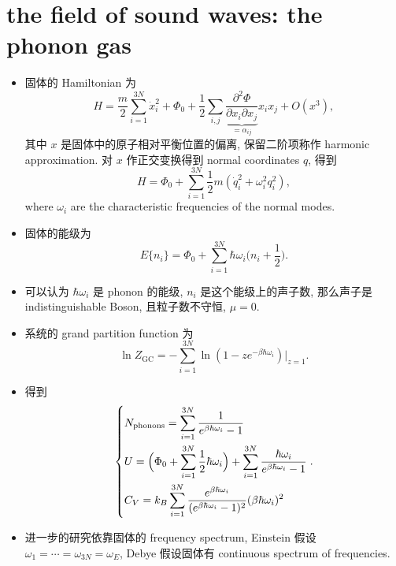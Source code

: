 \section{the field of sound waves: the phonon gas} \label{7.4}
\begin{itemize}
	\item 固体的 Hamiltonian 为
	\begin{equation}
		H = \frac{m}{2} \sum_{i = 1}^{3 N} \dot{x}_i^2 + \Phi_0 + \frac{1}{2} \sum_{i, j} \underbrace{\frac{\partial^2 \Phi}{\partial x_i \partial x_j}}_{= \alpha_{i j}} x_i x_j + O(x^3),
	\end{equation}
	其中 $x$ 是固体中的原子相对平衡位置的偏离, 保留二阶项称作 harmonic approximation. 对 $x$ 作正交变换得到 normal coordinates $q$, 得到
	\begin{equation}
		H = \Phi_0 + \sum_{i = 1}^{3 N} \frac{1}{2} m (\dot{q}_i^2 + \omega_i^2 q_i^2),
	\end{equation}
	where $\omega_i$ are the characteristic frequencies of the normal modes.
	
	\item 固体的能级为
	\begin{equation}
		E\{n_i\} = \Phi_0 + \sum_{i = 1}^{3 N} \hbar \omega_i \Big( n_i + \frac{1}{2} \Big).
	\end{equation}
	
	\item 可以认为 $\hbar \omega_i$ 是 phonon 的能级, $n_i$ 是这个能级上的声子数, 那么声子是 indistinguishable Boson, 且粒子数不守恒, $\mu = 0$.
	
	\item 系统的 grand partition function 为
	\begin{equation}
		\ln Z_\text{GC} = - \sum_{i = 1}^{3 N} \ln(1 - z e^{- \beta \hbar \omega_i}) \Big|_{z = 1}.
	\end{equation}
	
	\item 得到
	\begin{equation}
		\begin{dcases}
			N_\text{phonons} = \sum_{i = 1}^{3 N} \frac{1}{e^{\beta \hbar \omega_i} - 1} \\
			U = \Big( \Phi_0 + \sum_{i = 1}^{3 N} \frac{1}{2} \hbar \omega_i \Big) + \sum_{i = 1}^{3 N} \frac{\hbar \omega_i}{e^{\beta \hbar \omega_i} - 1} \\
			C_V = k_B \sum_{i = 1}^{3 N} \frac{e^{\beta \hbar \omega_i}}{(e^{\beta \hbar \omega_i} - 1)^2} (\beta \hbar \omega_i)^2
		\end{dcases}.
	\end{equation}
	
	\item 进一步的研究依靠固体的 frequency spectrum, Einstein 假设 $\omega_1 = \cdots = \omega_{3 N} = \omega_E$, Debye 假设固体有 continuous spectrum of frequencies.
\end{itemize}

